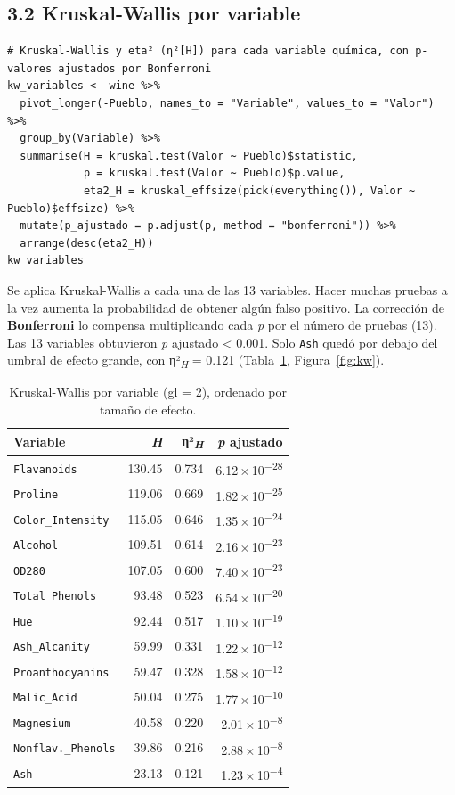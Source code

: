 \documentclass[10pt,letterpaper,twocolumn]{article}
\newcommand{\var}[1]{\texttt{#1}}
\newcommand{\etaH}{η²\textsubscript{\textit{H}}}
\newcommand{\pval}{\textit{p}}
\newcommand{\sci}[2]{#1\,×\,10\textsuperscript{−#2}}
\begin{document}
\subsection{3.2 Kruskal-Wallis por variable}

\begin{lstlisting}[firstnumber=534]
# Kruskal-Wallis y eta² (η²[H]) para cada variable química, con p-valores ajustados por Bonferroni
kw_variables <- wine %>%
  pivot_longer(-Pueblo, names_to = "Variable", values_to = "Valor") %>%
  group_by(Variable) %>%
  summarise(H = kruskal.test(Valor ~ Pueblo)$statistic,
            p = kruskal.test(Valor ~ Pueblo)$p.value,
            eta2_H = kruskal_effsize(pick(everything()), Valor ~ Pueblo)$effsize) %>%
  mutate(p_ajustado = p.adjust(p, method = "bonferroni")) %>%
  arrange(desc(eta2_H))
kw_variables
\end{lstlisting}

Se aplica Kruskal-Wallis a cada una de las 13 variables. Hacer muchas pruebas a la vez aumenta la probabilidad de obtener algún falso positivo. La corrección de \textbf{Bonferroni} lo compensa multiplicando cada \pval{} por el número de pruebas (13). Las 13 variables obtuvieron \pval{} ajustado < 0.001. Solo \var{Ash} quedó por debajo del umbral de efecto grande, con \etaH{} = 0.121 (Tabla~\ref{tab:kw}, Figura~\ref{fig:kw}).

\begin{table}[htbp]
  \centering
  \caption{Kruskal-Wallis por variable (gl = 2), ordenado por tamaño de efecto.}
  \label{tab:kw}
  \footnotesize
  \begin{tabular}{@{}lrrr@{}}
    \toprule
    \textbf{Variable} & \textbf{\textit{H}} & \textbf{\etaH} & \textbf{\textit{p} ajustado} \\
    \midrule
    \var{Flavanoids}           & 130.45 & 0.734 & \sci{6.12}{28} \\
    \var{Proline}              & 119.06 & 0.669 & \sci{1.82}{25} \\
    \var{Color\_Intensity}     & 115.05 & 0.646 & \sci{1.35}{24} \\
    \var{Alcohol}              & 109.51 & 0.614 & \sci{2.16}{23} \\
    \var{OD280}                & 107.05 & 0.600 & \sci{7.40}{23} \\
    \var{Total\_Phenols}       & 93.48  & 0.523 & \sci{6.54}{20} \\
    \var{Hue}                  & 92.44  & 0.517 & \sci{1.10}{19} \\
    \var{Ash\_Alcanity}        & 59.99  & 0.331 & \sci{1.22}{12} \\
    \var{Proanthocyanins}      & 59.47  & 0.328 & \sci{1.58}{12} \\
    \var{Malic\_Acid}          & 50.04  & 0.275 & \sci{1.77}{10} \\
    \var{Magnesium}            & 40.58  & 0.220 & \sci{2.01}{8} \\
    \var{Nonflav.\_Phenols}    & 39.86  & 0.216 & \sci{2.88}{8} \\
    \var{Ash}                  & 23.13  & 0.121 & \sci{1.23}{4} \\
    \bottomrule
  \end{tabular}
\end{table}
\end{document}
